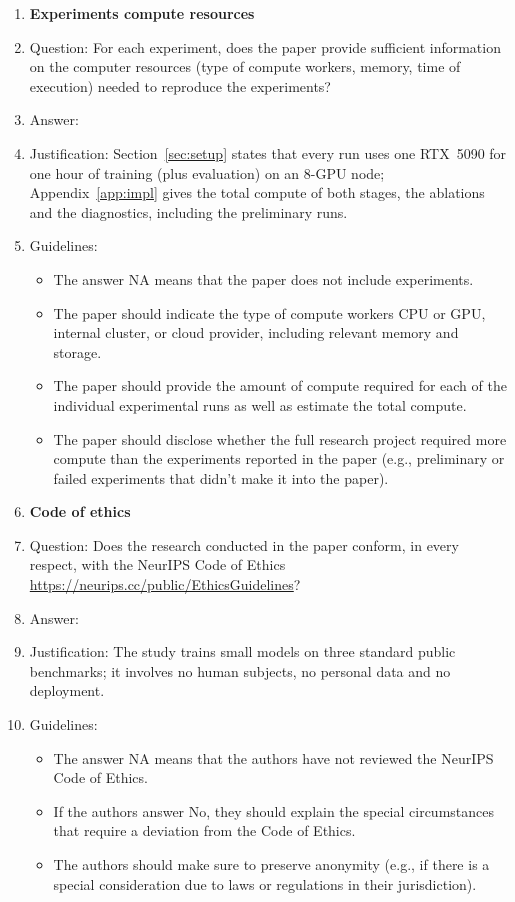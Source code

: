 \documentclass{article}
\begin{document}
\begin{enumerate}
\item {\bf Experiments compute resources}
    \item[] Question: For each experiment, does the paper provide sufficient information on the computer resources (type of compute workers, memory, time of execution) needed to reproduce the experiments?
    \item[] Answer: \answerYes{}
    \item[] Justification: Section~\ref{sec:setup} states that every run uses one RTX~5090 for one hour of training (plus evaluation) on an 8-GPU node; Appendix~\ref{app:impl} gives the total compute of both stages, the ablations and the diagnostics, including the preliminary runs.
    \item[] Guidelines:
    \begin{itemize}
        \item The answer NA means that the paper does not include experiments.
        \item The paper should indicate the type of compute workers CPU or GPU, internal cluster, or cloud provider, including relevant memory and storage.
        \item The paper should provide the amount of compute required for each of the individual experimental runs as well as estimate the total compute.
        \item The paper should disclose whether the full research project required more compute than the experiments reported in the paper (e.g., preliminary or failed experiments that didn't make it into the paper).
    \end{itemize}

\item {\bf Code of ethics}
    \item[] Question: Does the research conducted in the paper conform, in every respect, with the NeurIPS Code of Ethics \url{https://neurips.cc/public/EthicsGuidelines}?
    \item[] Answer: \answerYes{}
    \item[] Justification: The study trains small models on three standard public benchmarks; it involves no human subjects, no personal data and no deployment.
    \item[] Guidelines:
    \begin{itemize}
        \item The answer NA means that the authors have not reviewed the NeurIPS Code of Ethics.
        \item If the authors answer No, they should explain the special circumstances that require a deviation from the Code of Ethics.
        \item The authors should make sure to preserve anonymity (e.g., if there is a special consideration due to laws or regulations in their jurisdiction).
    \end{itemize}



\end{enumerate}
\end{document}
